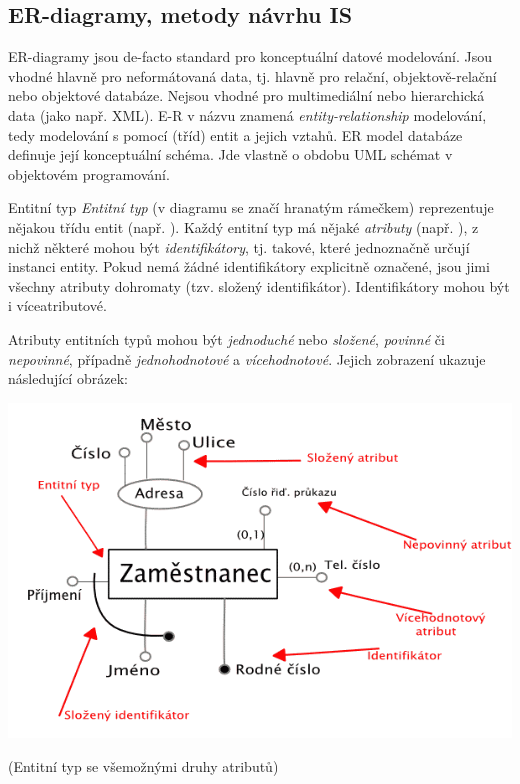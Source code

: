 \subsection{ER-diagramy, metody návrhu IS}

ER-diagramy jsou de-facto standard pro konceptuální datové modelování. Jsou vhodné hlavně pro  neformátovaná data, tj. hlavně pro relační, objektově-relační nebo objektové databáze. Nejsou vhodné pro multimediální nebo hierarchická data (jako např. XML). E-R v názvu znamená \emph{entity-relationship} modelování, tedy modelování s pomocí (tříd) entit a jejich vztahů. ER model databáze definuje její konceptuální schéma. Jde vlastně o obdobu UML schémat v objektovém programování.

\begin{obecne}{Entitní typ}
\emph{Entitní typ} (v diagramu se značí hranatým rámečkem) reprezentuje nějakou třídu entit (např. ). Každý entitní typ má nějaké \emph{atributy} (např. ), z nichž některé mohou být \emph{identifikátory}, tj. takové, které jednoznačně určují instanci entity. Pokud nemá žádné identifikátory explicitně označené, jsou jimi všechny atributy dohromaty (tzv. složený identifikátor). Identifikátory mohou být i víceatributové. 

Atributy entitních typů mohou být \emph{jednoduché} nebo \emph{složené}, \emph{povinné} či \emph{nepovinné}, případně \emph{jednohodnotové} a \emph{vícehodnotové}. Jejich zobrazení ukazuje následující obrázek:

\begin{center}
\includegraphics[width=14cm]{informatika/databazy/obrazky/er1.png}

(Entitní typ se všemožnými druhy atributů)
\end{center}
\end{obecne}


